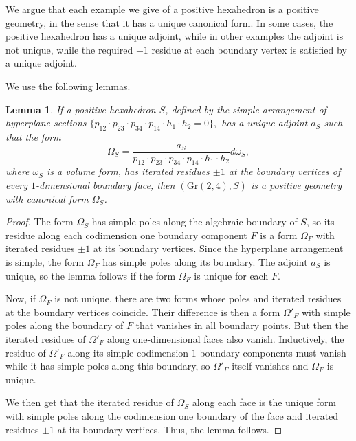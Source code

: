 \documentclass[12pt]{extarticle}
\newtheorem{lemma}[theorem]{Lemma}
\theoremstyle{definition}
\begin{document}
 We argue that each example we give of a positive hexahedron is a positive geometry, in the sense that it has a unique canonical form. In some cases, the positive hexahedron  has a unique adjoint, while in other examples the adjoint is not unique, while the required $\pm 1$ residue at each boundary vertex is satisfied by a unique adjoint. 

 We use the following lemmas.
 \begin{lemma}\label{residueinvertices}
     If a positive hexahedron $S$, defined by the simple arrangement of hyperplane sections
     $\{p_{12}\cdot p_{23}\cdot p_{34}\cdot p_{14}\cdot h_1\cdot h_2=0\},$ 
     has a unique adjoint $a_S$ such that the form 
     $$\Omega_S=\frac{a_S}{p_{12}\cdot p_{23}\cdot p_{34}\cdot p_{14}\cdot h_1\cdot h_2}d\omega_S,$$ where $\omega_S$ is a volume form, 
     has iterated residues $\pm 1$ at the boundary vertices of every $1$-dimensional boundary face, then  $(\mathrm{Gr}(2,4), S)$  is a positive geometry with canonical form $\Omega_S$.   
 \end{lemma}
 \begin{proof} The form $\Omega_S$ has simple poles along the algebraic boundary of $S$, so its residue along each codimension one boundary component $F$ is a form $\Omega_F$ with iterated residues $\pm 1$ at its boundary vertices. Since the hyperplane arrangement is simple, the form $\Omega_F$ has simple poles along its boundary. The adjoint $a_S$ is unique, so the lemma follows if the form $\Omega_F$ is unique for each $F$.
 
 Now, if $\Omega_F$ is not unique, there are two forms whose poles and iterated residues at the boundary vertices coincide. Their difference is then a form $\Omega'_F$ with simple poles along the boundary of $F$ that vanishes in all boundary points.  
 But then the iterated residues of $\Omega'_F$ along one-dimensional faces also vanish. Inductively, the residue of $\Omega'_F$ along its simple codimension $1$ boundary components must vanish while it has simple poles along this boundary, so $\Omega'_F$ itself vanishes and $\Omega_F$ is unique.

We then get that the iterated residue of
 $\Omega_S$ along each face is the unique form with simple poles along the codimension one boundary of the face and iterated residues $\pm 1$ at its boundary vertices. Thus, the lemma follows. 
 \end{proof}
 
\end{document}
